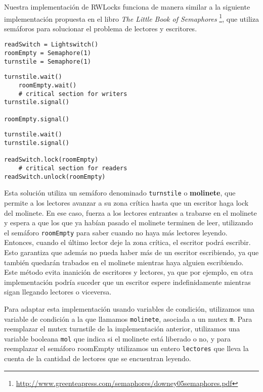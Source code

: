 \par Nuestra implementación de RWLocks funciona de manera similar a la siguiente implementación propuesta en  el libro \textit{The Little Book of Semaphores} \footnote{\url{http://www.greenteapress.com/semaphores/downey05semaphores.pdf}}, que utiliza semáforos para solucionar el problema de lectores y escritores.

\begin{lstlisting}[caption= No-starve readers-writers initialization, style=C]
readSwitch = Lightswitch()
roomEmpty = Semaphore(1)
turnstile = Semaphore(1)
\end{lstlisting}

\begin{lstlisting}[caption= No-starve writer solution, style=C]
turnstile.wait()
	roomEmpty.wait()
	# critical section for writers
turnstile.signal()

roomEmpty.signal()
\end{lstlisting}


\begin{lstlisting}[caption= No-starve reader solution, style=C]
turnstile.wait()
turnstile.signal()

readSwitch.lock(roomEmpty)
	# critical section for readers
readSwitch.unlock(roomEmpty)
\end{lstlisting}

\par Esta solución utiliza un semáforo denominado \texttt{turnstile} o \textbf{molinete}, que permite a los lectores avanzar a su zona crítica hasta que un escritor haga lock del molinete. En ese caso, fuerza a los lectores entrantes a trabarse en el molinete y espera a que los que ya habían pasado el molinete terminen de leer, utilizando el semáforo \texttt{roomEmpty} para saber cuando no haya más lectores leyendo. Entonces, cuando el último lector deje la zona crítica, el escritor podrá escribir. Esto garantiza que además no pueda haber más de un escritor escribiendo, ya que también quedarán trabados en el molinete mientras haya alguien escribiendo. Este método evita inanición de escritores y lectores, ya que por ejemplo, en otra implementación podría suceder que un escritor espere indefinidamente mientras sigan llegando lectores o viceversa.
\par Para adaptar esta implementación usando variables de condición, utilizamos una variable de condición a la que llamamos \texttt{molinete}, asociada a un mutex \texttt{m}. Para reemplazar el mutex turnstile de la implementación anterior, utilizamos una variable booleana \texttt{mol} que indica si el molinete está liberado o no, y para reemplazar el semáforo roomEmpty utilizamos un entero \texttt{lectores} que lleva la cuenta de la cantidad de lectores que se encuentran leyendo.

